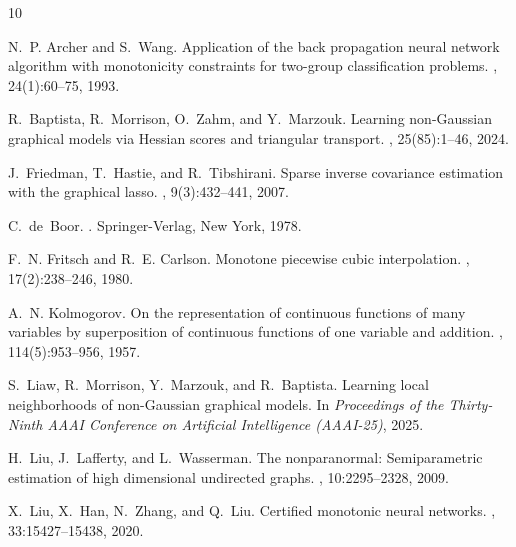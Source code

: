 \documentclass[11pt,a4paper]{article}
\theoremstyle{plain}
\theoremstyle{definition}
\theoremstyle{remark}
\begin{document}
% 

\begin{thebibliography}{10}

N.~P. Archer and S.~Wang.
\newblock Application of the back propagation neural network algorithm with monotonicity constraints for two-group classification problems.
, 24(1):60--75, 1993.

R.~Baptista, R.~Morrison, O.~Zahm, and Y.~Marzouk.
\newblock Learning non-{G}aussian graphical models via {H}essian scores and triangular transport.
, 25(85):1--46, 2024.

J.~Friedman, T.~Hastie, and R.~Tibshirani.
\newblock Sparse inverse covariance estimation with the graphical lasso.
, 9(3):432--441, 2007.

C.~de~Boor.
.
\newblock Springer-Verlag, New York, 1978.

F.~N. Fritsch and R.~E. Carlson.
\newblock Monotone piecewise cubic interpolation.
, 17(2):238--246, 1980.

A.~N. Kolmogorov.
\newblock On the representation of continuous functions of many variables by superposition of continuous functions of one variable and addition.
, 114(5):953--956, 1957.

S.~Liaw, R.~Morrison, Y.~Marzouk, and R.~Baptista.
\newblock Learning local neighborhoods of non-{G}aussian graphical models.
\newblock In {\em Proceedings of the Thirty-Ninth AAAI Conference on Artificial Intelligence (AAAI-25)}, 2025.

H.~Liu, J.~Lafferty, and L.~Wasserman.
\newblock The nonparanormal: Semiparametric estimation of high dimensional undirected graphs.
, 10:2295--2328, 2009.

X.~Liu, X.~Han, N.~Zhang, and Q.~Liu.
\newblock Certified monotonic neural networks.
, 33:15427--15438, 2020.


\end{thebibliography}
\end{document}
